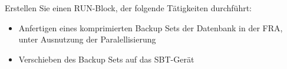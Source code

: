     \item Erstellen Sie einen RUN-Block, der folgende T\"atigkeiten durchf\"uhrt:
      \begin{itemize}
        \item Anfertigen eines komprimierten Backup Sets der Datenbank in der FRA, unter Ausnutzung der Paralellisierung
        \item Verschieben des Backup Sets auf das SBT-Ger\"at
      \end{itemize}

